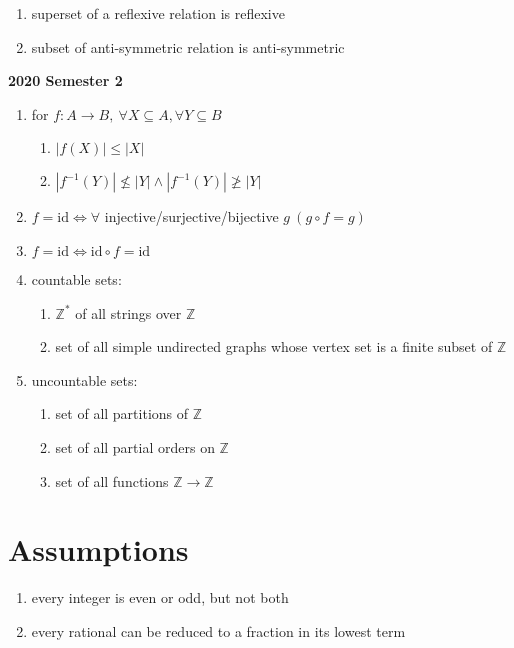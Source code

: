 \documentclass[landscape, a4paper]{article}
\let\leq\leqslant
\let\geq\geqslant
\newcommand{\Z}{\mathbb{Z}}
\renewcommand{\and}{\wedge}
\newcommand{\customsection}[1]{
    \vspace*{-16pt}
    \section*{#1}
    \vspace*{-4pt}
}
\newcommand{\heading}[1]{
    \noindent\textbf{#1}
}
\newenvironment{wenumerate}{\begin{enumerate}[wide, labelindent=2pt]}{\end{enumerate}}
\begin{document}
\begin{multicols*}{4}
\begin{enumerate}
        \item superset of a reflexive relation is reflexive
        \item subset of anti-symmetric relation is anti-symmetric
    \end{enumerate}
    \heading{2020 Semester 2}
    \begin{wenumerate}
        \item for $f:A\rightarrow B,\ \forall X\subseteq A, \forall Y\subseteq B$
        \begin{enumerate}
            \item $|f(X)|\leq |X|$
            \item $|f^{-1}(Y)|\not\leq|Y|\and |f^{-1}(Y)|\not\geq|Y|$
        \end{enumerate}
        \item $f=\text{id} \iff \forall$ injective/surjective/bijective $g\ (g\circ f=g)$
        \item $f=\text{id} \iff \text{id}\circ f = \text{id}$
        \item countable sets:
        \begin{enumerate}
            \item $\Z^*$ of all strings over $\Z$
            \item set of all simple undirected graphs whose vertex set is a finite subset of $\Z$
        \end{enumerate}
        \item uncountable sets:
        \begin{enumerate}
            \item set of all partitions of $\Z$
            \item set of all partial orders on $\Z$
            \item set of all functions $\Z\rightarrow\Z$
        \end{enumerate}
    \end{wenumerate}
    \customsection{Assumptions}
    \begin{wenumerate}
        \item every integer is even or odd, but not both
        \item every rational can be reduced to a fraction in its lowest term
    \end{wenumerate}
\end{multicols*}
\end{document}
